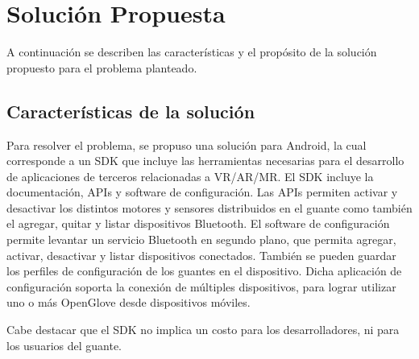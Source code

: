 \section{Solución Propuesta}
A continuación se describen las características y el propósito de la solución propuesto para el problema planteado.

\subsection{Características de la solución}
Para resolver el problema, se propuso una solución para Android, la cual corresponde a un SDK que incluye las herramientas necesarias para el desarrollo de aplicaciones de terceros relacionadas a VR/AR/MR. El SDK incluye la documentación, APIs y software de configuración. Las APIs permiten activar y desactivar los distintos motores y sensores distribuidos en el guante como también el agregar, quitar y listar dispositivos Bluetooth. El software de configuración permite levantar un servicio Bluetooth en segundo plano, que permita agregar, activar, desactivar y listar dispositivos conectados. También se pueden guardar los perfiles de configuración de los guantes en el dispositivo. Dicha aplicación de configuración soporta  la conexión de múltiples dispositivos,  para lograr utilizar uno o más OpenGlove desde dispositivos móviles.

Cabe destacar que el SDK no implica un costo para los desarrolladores, ni para los usuarios del guante.

